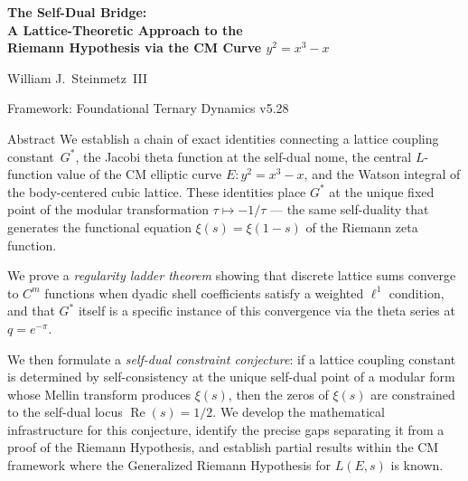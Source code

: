 \documentclass[11pt]{article}
\theoremstyle{tight}
\theoremstyle{plainroman}
\begin{document}
\begin{titlepage}
\centering
\vspace*{1.8cm}
{\fontsize{21}{26}\selectfont\bfseries\color{accent}
The Self-Dual Bridge:\\[0.3em]
A Lattice-Theoretic Approach to the\\[0.3em]
Riemann Hypothesis via the CM Curve $y^2=x^3-x$\par}
\vspace{0.8cm}
{\large William J.\ Steinmetz~III\par}
\vspace{0.3cm}
{\normalsize Framework: Foundational Ternary Dynamics v5.28\par}
\vspace{1.2cm}
\begin{minipage}{0.86\textwidth}
\begin{statusbox}{Abstract}
We establish a chain of exact identities connecting a lattice coupling constant~$G^*$, the Jacobi theta function at the self-dual nome, the central $L$-function value of the CM elliptic curve $E:y^2=x^3-x$, and the Watson integral of the body-centered cubic lattice.
These identities place $G^*$ at the unique fixed point of the modular transformation $\tau\mapsto -1/\tau$ --- the same self-duality that generates the functional equation $\xi(s)=\xi(1-s)$ of the Riemann zeta function.

We prove a \emph{regularity ladder theorem} showing that discrete lattice sums converge to $C^m$ functions when dyadic shell coefficients satisfy a weighted $\ell^1$ condition, and that $G^*$ itself is a specific instance of this convergence via the theta series at $q=e^{-\pi}$.

We then formulate a \emph{self-dual constraint conjecture}: if a lattice coupling constant is determined by self-consistency at the unique self-dual point of a modular form whose Mellin transform produces $\xi(s)$, then the zeros of $\xi(s)$ are constrained to the self-dual locus $\operatorname{Re}(s)=1/2$.
We develop the mathematical infrastructure for this conjecture, identify the precise gaps separating it from a proof of the Riemann Hypothesis, and establish partial results within the CM framework where the Generalized Riemann Hypothesis for $L(E,s)$ is known.
\end{statusbox}
\end{minipage}
\vfill
\end{titlepage}
\tableofcontents
\thispagestyle{empty}
\clearpage
\end{document}
